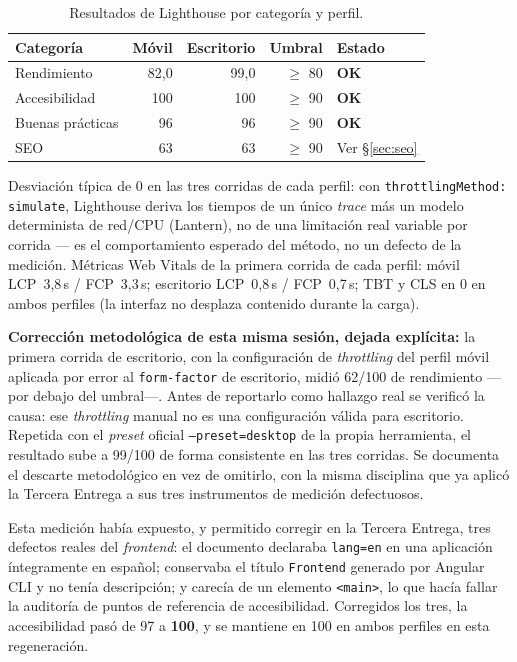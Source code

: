 \documentclass[11pt,a4paper]{article}
\newcommand{\ok}{\textcolor{okverde}{\textbf{OK}}}
\begin{document}
\begin{table}[htbp]
\centering
\caption{Resultados de Lighthouse por categoría y perfil.}
\label{tab:lighthouse}
\begin{tabular}{@{}lrrrl@{}}
\toprule
\textbf{Categoría} & \textbf{Móvil} & \textbf{Escritorio} & \textbf{Umbral} & \textbf{Estado} \\
\midrule
Rendimiento & 82,0 & 99,0 & $\geq$ 80 & \ok \\
Accesibilidad & 100 & 100 & $\geq$ 90 & \ok \\
Buenas prácticas & 96 & 96 & $\geq$ 90 & \ok \\
SEO & 63 & 63 & $\geq$ 90 & Ver §\ref{sec:seo} \\
\bottomrule
\end{tabular}
\end{table}

Desviación típica de 0 en las tres corridas de cada perfil: con
\texttt{throttlingMethod: simulate}, Lighthouse deriva los tiempos de un
único \emph{trace} más un modelo determinista de red/CPU (Lantern), no
de una limitación real variable por corrida — es el comportamiento
esperado del método, no un defecto de la medición. Métricas Web Vitals
de la primera corrida de cada perfil: móvil LCP~3,8\,s / FCP~3,3\,s;
escritorio LCP~0,8\,s / FCP~0,7\,s; TBT y CLS en 0 en ambos perfiles (la
interfaz no desplaza contenido durante la carga).

\textbf{Corrección metodológica de esta misma sesión, dejada explícita:}
la primera corrida de escritorio, con la configuración de
\emph{throttling} del perfil móvil aplicada por error al
\texttt{form-factor} de escritorio, midió 62/100 de rendimiento
—por debajo del umbral—. Antes de reportarlo como hallazgo real se
verificó la causa: ese \emph{throttling} manual no es una configuración
válida para escritorio. Repetida con el \emph{preset} oficial
\texttt{--preset=desktop} de la propia herramienta, el resultado sube a
99/100 de forma consistente en las tres corridas. Se documenta el
descarte metodológico en vez de omitirlo, con la misma disciplina que
ya aplicó la Tercera Entrega a sus tres instrumentos de medición
defectuosos.

Esta medición había expuesto, y permitido corregir en la Tercera
Entrega, tres defectos reales del \emph{frontend}: el documento
declaraba \texttt{lang=\textquotedbl{}en\textquotedbl{}} en una
aplicación íntegramente en español; conservaba el título
\texttt{Frontend} generado por Angular CLI y no tenía descripción; y
carecía de un elemento \texttt{<main>}, lo que hacía fallar la
auditoría de puntos de referencia de accesibilidad. Corregidos los
tres, la accesibilidad pasó de 97 a \textbf{100}, y se mantiene en 100
en ambos perfiles en esta regeneración.
\end{document}
